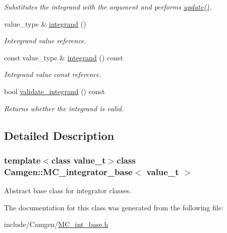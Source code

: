 \begin{DoxyCompactItemize}
\begin{DoxyCompactList}\small\item\em Substitutes the integrand with the argument and performs \hyperlink{a00370_adce320174be43d256e68e344b1d87e7e}{update()}. \end{DoxyCompactList}\item 
\hypertarget{a00370_af1e218e86ac45f36b40fb1a6d8fcb7a4}{}value\+\_\+type \& \hyperlink{a00370_af1e218e86ac45f36b40fb1a6d8fcb7a4}{integrand} ()\label{a00370_af1e218e86ac45f36b40fb1a6d8fcb7a4}

\begin{DoxyCompactList}\small\item\em Intergrand value reference. \end{DoxyCompactList}\item 
\hypertarget{a00370_a1314fa7effd46afaf87e633432ad9069}{}const value\+\_\+type \& \hyperlink{a00370_a1314fa7effd46afaf87e633432ad9069}{integrand} () const \label{a00370_a1314fa7effd46afaf87e633432ad9069}

\begin{DoxyCompactList}\small\item\em Integrand value const reference. \end{DoxyCompactList}\item 
\hypertarget{a00370_af280e33e904654a05daa7a736eaf3410}{}bool \hyperlink{a00370_af280e33e904654a05daa7a736eaf3410}{validate\+\_\+integrand} () const \label{a00370_af280e33e904654a05daa7a736eaf3410}

\begin{DoxyCompactList}\small\item\em Returns whether the integrand is valid. \end{DoxyCompactList}\end{DoxyCompactItemize}


\subsection{Detailed Description}
\subsubsection*{template$<$class value\+\_\+t$>$class Camgen\+::\+M\+C\+\_\+integrator\+\_\+base$<$ value\+\_\+t $>$}

Abstract base class for integrator classes. 

The documentation for this class was generated from the following file\+:\begin{DoxyCompactItemize}
\item 
include/\+Camgen/\hyperlink{a00693}{M\+C\+\_\+int\+\_\+base.\+h}\end{DoxyCompactItemize}
